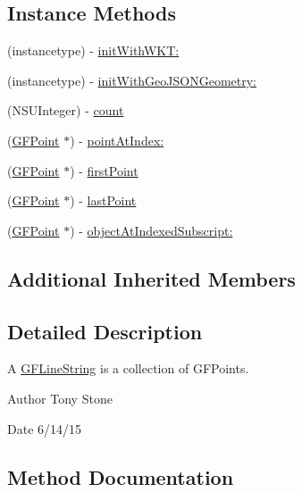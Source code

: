 \subsection*{Instance Methods}
\begin{DoxyCompactItemize}
\item 
(instancetype) -\/ \hyperlink{interface_g_f_line_string_a261a4d08fe5cb35f935d265c3a97f453}{init\+With\+W\+K\+T\+:}
\item 
(instancetype) -\/ \hyperlink{interface_g_f_line_string_ad7a913bc12b6099982229190d1debd71}{init\+With\+Geo\+J\+S\+O\+N\+Geometry\+:}
\item 
(N\+S\+U\+Integer) -\/ \hyperlink{interface_g_f_line_string_a58fc2980cff73581d57943a64d60ddba}{count}
\item 
(\hyperlink{interface_g_f_point}{G\+F\+Point} $\ast$) -\/ \hyperlink{interface_g_f_line_string_a51963123a916fd666131859f571e2609}{point\+At\+Index\+:}
\item 
(\hyperlink{interface_g_f_point}{G\+F\+Point} $\ast$) -\/ \hyperlink{interface_g_f_line_string_a1fc7f9d3388d5237cb824573e8f6f71f}{first\+Point}
\item 
(\hyperlink{interface_g_f_point}{G\+F\+Point} $\ast$) -\/ \hyperlink{interface_g_f_line_string_aa9db281010dcfe2ab30b697710859dde}{last\+Point}
\item 
(\hyperlink{interface_g_f_point}{G\+F\+Point} $\ast$) -\/ \hyperlink{interface_g_f_line_string_a0711dbf3ae2b60f3f4d447578f544323}{object\+At\+Indexed\+Subscript\+:}
\end{DoxyCompactItemize}
\subsection*{Additional Inherited Members}


\subsection{Detailed Description}
A \hyperlink{interface_g_f_line_string}{G\+F\+Line\+String} is a collection of G\+F\+Points. 

\begin{DoxyAuthor}{Author}
Tony Stone 
\end{DoxyAuthor}
\begin{DoxyDate}{Date}
6/14/15 
\end{DoxyDate}


\subsection{Method Documentation}
\hypertarget{interface_g_f_line_string_a261a4d08fe5cb35f935d265c3a97f453}{}
